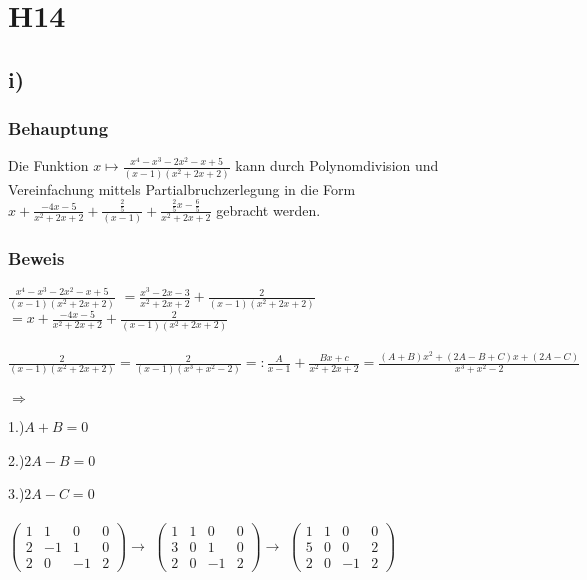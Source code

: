 \section*{H14}

\subsection*{i)}

\subsubsection*{Behauptung}

Die Funktion $x \mapsto \frac{x^4-x^3-2x^2-x+5}{(x-1)(x^2+2x+2)}$ kann durch Polynomdivision und Vereinfachung mittels Partialbruchzerlegung in die Form 
$x+\frac{-4x-5}{x^2+2x+2}+\frac{\frac{2}{5}}{(x-1)}+\frac{\frac{2}{5}x-\frac{6}{5}}{x^2+2x+2}$ gebracht werden.

\subsubsection*{Beweis}

$\frac{x^4-x^3-2x^2-x+5}{(x-1)(x^2+2x+2)}$
$= \frac{x^3-2x-3}{x^2+2x+2} + \frac{2}{(x-1)(x^2+2x+2)}$
$= x + \frac{-4x-5}{x^2+2x+2} + \frac{2}{(x-1)(x^2+2x+2)}$

\paragraph*{}

$\frac{2}{(x-1)(x^2+2x+2)}
= \frac{2}{(x-1)(x^3+x^2-2)}
=: \frac{A}{x-1} + \frac{Bx+c}{x^2+2x+2}
= \frac{(A+B)x^2+(2A-B+C)x+(2A-C)}{x^3+x^2-2}$
\paragraph*{}

$\Rightarrow$

1.)$A+B = 0$

2.)$2A-B = 0$

3.)$2A-C = 0$

\paragraph*{}

$\left(\begin{array}{ccc|c}
1 & 1 & 0 & 0 \\ 
2 & -1 & 1 & 0 \\ 
2 & 0 & -1 & 2
\end{array}\right) \to $
$\left(\begin{array}{ccc|c}
1 & 1 & 0 & 0 \\ 
3 & 0 & 1 & 0 \\ 
2 & 0 & -1 & 2
\end{array}\right) \to $
$\left(\begin{array}{ccc|c}
1 & 1 & 0 & 0 \\ 
5 & 0 & 0 & 2 \\ 
2 & 0 & -1 & 2
\end{array}\right)$



